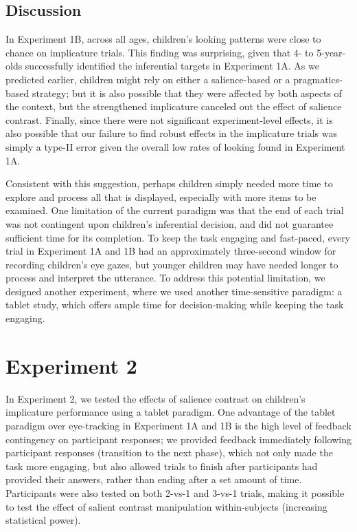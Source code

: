 \documentclass[a4paper,man,apacite,floatsintext]{apa6}
\begin{document}
\subsection{Discussion}\label{discussion-1}

In Experiment 1B, across all ages, children's looking patterns were
close to chance on implicature trials. This finding was surprising,
given that 4- to 5-year-olds successfully identified the inferential
targets in Experiment 1A. As we predicted earlier, children might rely
on either a salience-based or a pragmatics-based strategy; but it is
also possible that they were affected by both aspects of the context,
but the strengthened implicature canceled out the effect of salience
contrast. Finally, since there were not significant experiment-level
effects, it is also possible that our failure to find robust effects in
the implicature trials was simply a type-II error given the overall low
rates of looking found in Experiment 1A.

Consistent with this suggestion, perhaps children simply needed more
time to explore and process all that is displayed, especially with more
items to be examined. One limitation of the current paradigm was that
the end of each trial was not contingent upon children's inferential
decision, and did not guarantee sufficient time for its completion. To
keep the task engaging and fast-paced, every trial in Experiment 1A and
1B had an approximately three-second window for recording children's eye
gazes, but younger children may have needed longer to process and
interpret the utterance. To address this potential limitation, we
designed another experiment, where we used another time-sensitive
paradigm: a tablet study, which offers ample time for decision-making
while keeping the task engaging.

\section{Experiment 2}\label{experiment-2}

In Experiment 2, we tested the effects of salience contrast on
children's implicature performance using a tablet paradigm. One
advantage of the tablet paradigm over eye-tracking in Experiment 1A and
1B is the high level of feedback contingency on participant responses;
we provided feedback immediately following participant responses
(transition to the next phase), which not only made the task more
engaging, but also allowed trials to finish after participants had
provided their answers, rather than ending after a set amount of time.
Participants were also tested on both 2-vs-1 and 3-vs-1 trials, making
it possible to test the effect of salient contrast manipulation
within-subjects (increasing statistical power).
\end{document}
